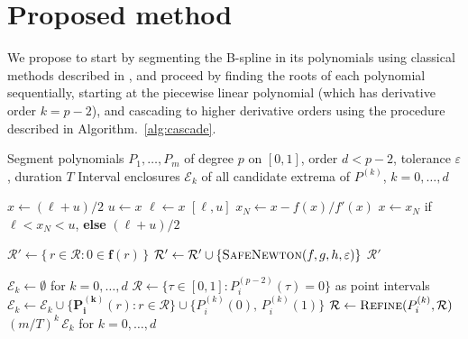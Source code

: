 \documentclass[final,5p,times,twocolumn]{elsarticle}
\theoremstyle{definition}
\newcommand{\iv}[1]{\mathbf{#1}}
\begin{document}
\section{Proposed method} \label{sec:proposed_method}

We propose to start by segmenting the B-spline in its polynomials using classical methods described in \cite{Kim2002}, and proceed by finding the roots of each polynomial sequentially, starting at the piecewise linear polynomial (which has derivative order $k=p-2$), and cascading to higher derivative orders using the procedure described in Algorithm.~\ref{alg:cascade}. 

\begin{algorithm}[!htbp]
\caption{Certified extrema of a B-spline and its derivatives}
\label{alg:cascade}
\begin{algorithmic}[1]
\Require Segment polynomials $P_1,\dots,P_m$ of degree $p$ on $[0,1]$, order $d<p-2$, tolerance $\varepsilon$, duration $T$
\Ensure Interval enclosures $\mathcal{E}_k$ of all candidate extrema of $P^{(k)}$, $k=0,\dots,d$
\Statex

 
\label{alg:SafeNewton}
  \State $x \gets (\ell+u)/2$
     $u\gets x$ \Else{} $\ell\gets x$ \EndIf {}
     \State \Return $[\ell,u]$ \EndIf
    \State $x_N \gets x - f(x)/f'(x)$
    \State $x \gets x_N$ if $\ell<x_N<u$, \textbf{else} $(\ell+u)/2$ 
  \EndWhile
\EndProcedure
\Statex

 
\label{alg:Refine}
  \State $\mathcal{R}' \gets \{\, r\in\mathcal{R} : 0\in\iv{f}(r) \,\}$ 
   
      \State $\mathcal{R}' \gets \mathcal{R}' \cup \{\textsc{SafeNewton}(f,g,h,\varepsilon)\}$
    \EndIf
  \EndFor
  \State \Return $\mathcal{R}'$
\EndProcedure
\Statex

\State $\mathcal{E}_k \gets \emptyset$ for $k=0,\dots,d$
  \State $\mathcal{R} \gets \{\tau\in[0,1] : P_i^{(p-2)}(\tau)=0\}$ as point intervals 
      \State $\mathcal{E}_k \gets \mathcal{E}_k \cup \{\iv{P_i^{(k)}}(r) : r\in\mathcal{R}\} \cup \{P_i^{(k)}(0),\,P_i^{(k)}(1)\}$
    \EndIf
     \State $\mathcal{R} \gets \textsc{Refine}(P_i^{(k)},\mathcal{R})$ \EndIf
  \EndFor
\EndFor
\State \Return $(m/T)^k\,\mathcal{E}_k$ for $k=0,\dots,d$ 
\end{algorithmic}
\end{algorithm}
\end{document}
